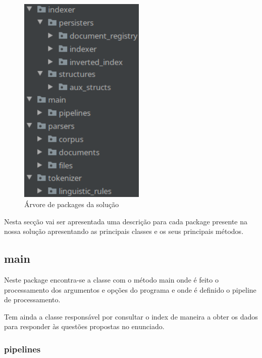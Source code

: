 \documentclass[12pt]{article}
\begin{document}
\begin{figure}[H]
  \center
  \includegraphics[width=6cm]{packages_all.png}
  \caption{Árvore de packages da solução}
\end{figure}

Nesta secção vai ser apresentada uma descrição para cada package presente na
nossa solução apresentando as principais classes e os seus principais métodos. 

\subsection{main}

Neste package encontra-se a classe com o método main onde é feito o
processamento dos argumentos e opções do programa e onde é definido o
pipeline de processamento.

Tem ainda a classe responsável por consultar o index de maneira a
obter os dados para responder às questões propostas no enunciado.

\subsubsection{pipelines}
\end{document}
